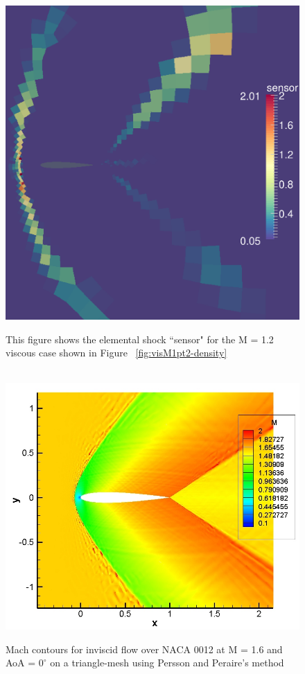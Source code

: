 \begin{figure}[h] \tt
\centering
\includegraphics[angle=0, scale = 0.55]{./figures/sensor-t1050010-spectral.eps}
\caption{This figure shows the elemental shock ``sensor" for the M = 1.2 viscous case shown in Figure ~\ref{fig:visM1pt2-density}}
\label{fig:sensor}
\end{figure}

\begin{figure}[h] \tt
\centering
\includegraphics[angle=0, scale = 0.68]{./figures/M1pt6order3-inv-720ktime-mach.jpg} \\
\caption{Mach contours for inviscid flow over NACA 0012 at M = 1.6 and AoA = $0^{\circ} $ on a triangle-mesh using Persson and Peraire's method}
\label{fig:inv_mach}
\end{figure}


